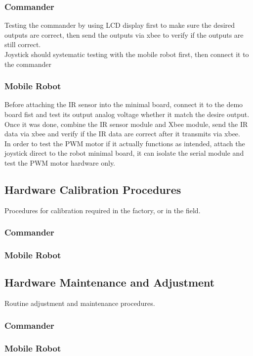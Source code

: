 \documentclass[11pt,a4paper]{article}
\begin{document}
    \subsubsection{Commander}
    Testing the commander by using LCD display first to make sure the desired outputs are correct, then send the outputs via
    xbee to verify if the outputs are still correct. \\
    Joystick should systematic testing with the mobile robot first, then connect it to the commander\\
    \subsubsection{Mobile Robot}
    Before attaching the IR sensor into the minimal board, connect it to the demo board fist and test its output analog          voltage whether it match the desire output. Once it was done, combine the IR sensor module and Xbee module, send the IR      data via xbee and verify if the IR data are correct after it transmits via xbee.\\
    In order to test the PWM motor if it actually functions as intended, attach the joystick direct to the robot minimal board, it can isolate the serial module and test the PWM motor hardware only. \\

  \subsection{Hardware Calibration Procedures}
    Procedures for calibration required in the factory, or in the field.
    \subsubsection{Commander}
    \subsubsection{Mobile Robot}

  \subsection{Hardware Maintenance and Adjustment}
    Routine adjustment and maintenance procedures.
    \subsubsection{Commander}
    \subsubsection{Mobile Robot}
\end{document}
